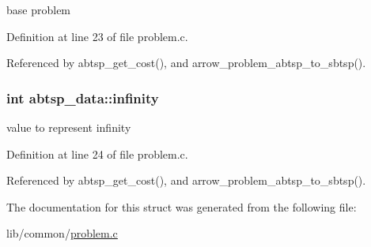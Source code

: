 base problem 

Definition at line 23 of file problem.c.

Referenced by abtsp\_\-get\_\-cost(), and arrow\_\-problem\_\-abtsp\_\-to\_\-sbtsp().\hypertarget{structabtsp__data_574a2f0aaf850223729244a9d2a0a4a5}{
\subsubsection{\setlength{\rightskip}{0pt plus 5cm}int {\bf abtsp\_\-data::infinity}}}
\label{structabtsp__data_574a2f0aaf850223729244a9d2a0a4a5}


value to represent infinity 

Definition at line 24 of file problem.c.

Referenced by abtsp\_\-get\_\-cost(), and arrow\_\-problem\_\-abtsp\_\-to\_\-sbtsp().

The documentation for this struct was generated from the following file:\begin{CompactItemize}
\item 
lib/common/\hyperlink{problem_8c}{problem.c}\end{CompactItemize}
